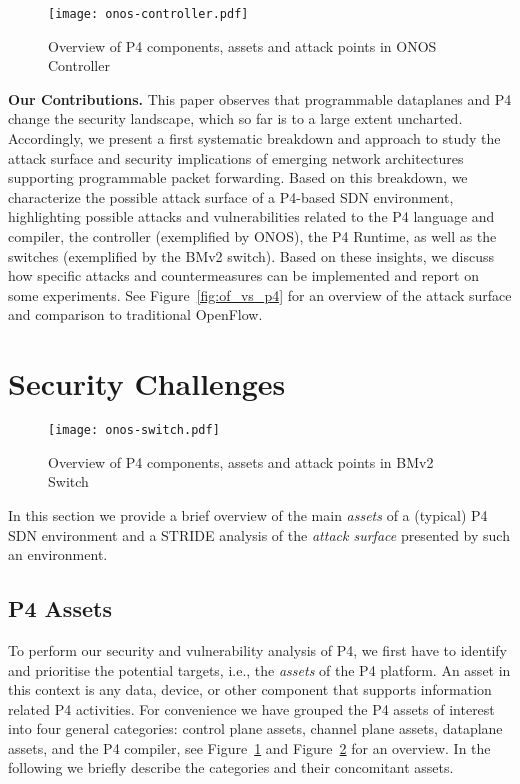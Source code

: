 \documentclass[10pt,sigconf]{acmart}
\begin{document}
\begin{figure}[tp]
\centering
\texttt{[image: onos-controller.pdf]}
\caption{Overview of P4 components, assets and attack points in ONOS Controller}\label{fig:overview-onos}
\end{figure}

\noindent \textbf{Our Contributions.}
%
This paper observes that programmable dataplanes and P4
change the security landscape, which so far is to
a large extent uncharted.  
Accordingly, we present 
a first systematic breakdown and approach
to study the attack surface and security implications
of emerging network
architectures supporting programmable 
packet forwarding.
Based on this breakdown, we characterize the 
possible attack surface of a P4-based SDN environment,
highlighting possible attacks and vulnerabilities related to 
the P4 language and
compiler, the controller (exemplified by ONOS), the 
P4 Runtime, as well as the switches (exemplified by the BMv2 switch).
Based on these insights, we discuss how specific
attacks and countermeasures can be implemented and report
on some experiments.
See Figure~\ref{fig:of_vs_p4} 
for an overview of the attack surface and comparison to traditional OpenFlow.


\section{Security Challenges}\label{sec:taxonomy}

\begin{figure}[tp]
\centering
\texttt{[image: onos-switch.pdf]}
\caption{Overview of P4 components, assets and attack points in BMv2 Switch}\label{fig:overview-bmv2}
\end{figure}

In this section we provide a brief overview of the main \emph{assets}
of a (typical) P4 SDN environment and a STRIDE analysis of the
\emph{attack surface} presented by such an environment.


\subsection{P4 Assets}

To perform our security and vulnerability analysis of P4, we
first have to identify and prioritise the potential targets, i.e., the
\emph{assets} of the P4 platform. An asset in this context is any
data, device, or other component that supports information related P4
activities. For convenience we have grouped the P4 assets of interest
into four general categories: control plane assets, channel plane
assets, dataplane assets, and the P4 compiler, see
Figure~\ref{fig:overview-onos} and Figure~\ref{fig:overview-bmv2} for an overview. In the following we briefly
describe the categories and their concomitant assets.
\end{document}
